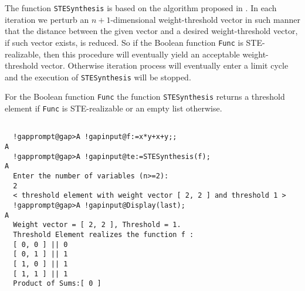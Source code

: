 \documentclass[a4paper,11pt]{report}
\begin{document}
{{{  The function \texttt{STESynthesis} is based on the algorithm proposed in \cite{Dertouzos65}. In each iteration we perturb an $n+1$-dimensional weight-threshold vector in such manner that the distance between
the given vector and a desired weight-threshold vector, if such vector exists,
is reduced. So if the Boolean function \texttt{Func} is STE-realizable, then this procedure will eventually yield an acceptable
weight-threshold vector. Otherwise iteration process will eventually enter a
limit cycle and the execution of \texttt{STE{\textunderscore}Synthesis} will be stopped. 

 For the Boolean function \texttt{Func} the function \texttt{STESynthesis} returns a threshold element if \texttt{Func} is STE-realizable or an empty list otherwise.

 
\begin{Verbatim}[commandchars=!@A,fontsize=\small,frame=single,label=Example]
  
  !gapprompt@gap>A !gapinput@f:=x*y+x+y;;
A
  !gapprompt@gap>A !gapinput@te:=STESynthesis(f);
A
  Enter the number of variables (n>=2):
  2
  < threshold element with weight vector [ 2, 2 ] and threshold 1 >
  !gapprompt@gap>A !gapinput@Display(last);
A
  Weight vector = [ 2, 2 ], Threshold = 1.
  Threshold Element realizes the function f :
  [ 0, 0 ] || 0
  [ 0, 1 ] || 1
  [ 1, 0 ] || 1
  [ 1, 1 ] || 1
  Product of Sums:[ 0 ]
  
\end{Verbatim}
 }

 }

  }

   
\end{document}

